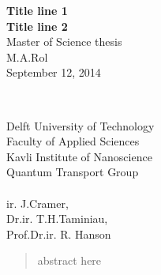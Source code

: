 \begin{titlingpage}
\voffset=-0.65cm                  %
\hoffset=1.3cm                    %
\thispagestyle{empty}           %
\hspace{0cm}                    %
\centering
\begin{minipage}[t]{13cm}
\vspace{3.5cm}
\centering \textbf{{\huge Title line 1 }}\\
\vspace{0.2cm}
\centering \textbf{{\huge Title line 2 }}\\
\vspace{1.5cm}
Master of Science thesis\\
\vspace{1.5cm}
{\LARGE M.A.Rol}\\
\vspace{0.5cm}
September 12, 2014
\end{minipage}\\
\begin{minipage}[b]{12cm}
\vspace{6.1cm}
Delft University of Technology\\
Faculty of Applied Sciences\\
Kavli Institute of Nanoscience\\
Quantum Transport Group\\\\
ir. J.Cramer,\\
Dr.ir. T.H.Taminiau,\\
Prof.Dr.ir. R. Hanson\\
\end{minipage}
\end{titlingpage}
\cleardoublepage



\vspace*{\fill}
\begin{abstract}
\thispagestyle{empty}
\noindent
abstract here
\end{abstract}
\vspace*{\fill}
\newpage
\thispagestyle{empty}
\mbox{}
\newpage
\pagestyle{headings}
\tableofcontents

\clearpage
\listoffigures

\clearpage
\listoftables
